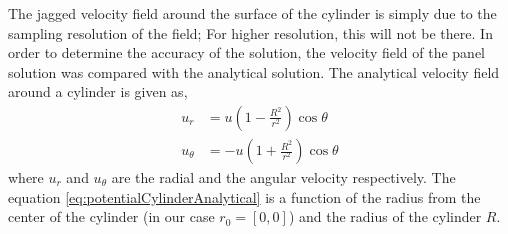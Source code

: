 The jagged velocity field around the surface of the cylinder is simply due to the sampling resolution of the field; For higher resolution, this will not be there. In order to determine the accuracy of the solution, the velocity field of the panel solution was compared with the analytical solution. The analytical velocity field around a cylinder is given as,
	\begin{subequations}
	\begin{align}
	u_r &= u\left(1 - \frac{R^2}{r^2}\right)\cos\theta\\
	u_{\theta} &= -u\left(1+\frac{R^2}{r^2}\right)\cos\theta
	\end{align}
	\label{eq:potentialCylinderAnalytical}
	\end{subequations}	
where $u_r$ and $u_{\theta}$ are the radial and the angular velocity respectively. The equation \ref{eq:potentialCylinderAnalytical} is a function of the radius from the center of the cylinder (in our case $r_0 = [0, 0]$) and the radius of the cylinder $R$. 

